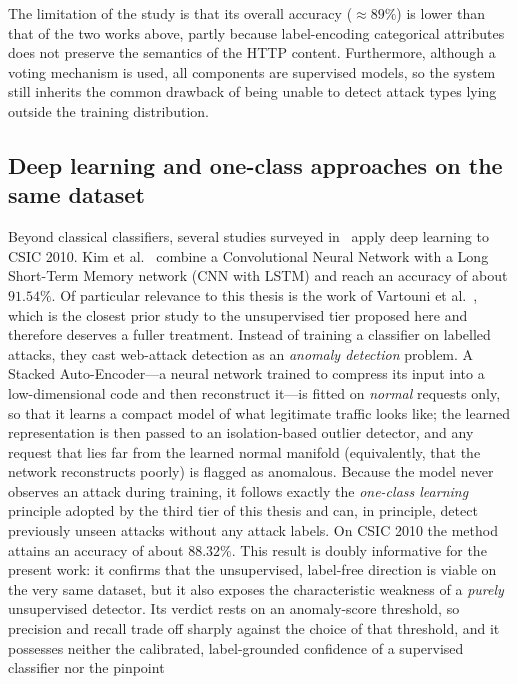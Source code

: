 \documentclass[../main.tex]{subfiles}
\begin{document}
The limitation of the study is that its overall accuracy ($\approx 89\%$)
is lower than that of the two works above, partly because label-encoding
categorical attributes does not preserve the semantics of the HTTP
content. Furthermore, although a voting mechanism is used, all components
are supervised models, so the system still inherits the common drawback of
being unable to detect attack types lying outside the training
distribution.

\subsection{Deep learning and one-class approaches on the same dataset}

Beyond classical classifiers, several studies surveyed
in~\cite{rawashdeh2023} apply deep learning to CSIC 2010. Kim et
al.~\cite{kim2020} combine a Convolutional Neural Network with a Long
Short-Term Memory network (CNN with LSTM) and reach an accuracy of about
$91.54\%$. Of particular relevance to this thesis is the work of Vartouni et
al.~\cite{vartouni2018}, which is the closest prior study to the unsupervised
tier proposed here and therefore deserves a fuller treatment. Instead of
training a classifier on labelled attacks, they cast web-attack detection as
an \emph{anomaly detection} problem. A Stacked Auto-Encoder---a neural network
trained to compress its input into a low-dimensional code and then reconstruct
it---is fitted on \emph{normal} requests only, so that it learns a compact
model of what legitimate traffic looks like; the learned representation is then
passed to an isolation-based outlier detector, and any request that lies far
from the learned normal manifold (equivalently, that the network reconstructs
poorly) is flagged as anomalous. Because the model never observes an attack
during training, it follows exactly the \emph{one-class learning} principle
adopted by the third tier of this thesis and can, in principle, detect
previously unseen attacks without any attack labels. On CSIC 2010 the method
attains an accuracy of about $88.32\%$. This result is doubly informative for
the present work: it confirms that the unsupervised, label-free direction is
viable on the very same dataset, but it also exposes the characteristic
weakness of a \emph{purely} unsupervised detector. Its verdict rests on an
anomaly-score threshold, so precision and recall trade off sharply against the
choice of that threshold, and it possesses neither the calibrated,
label-grounded confidence of a supervised classifier nor the pinpoint
\end{document}
